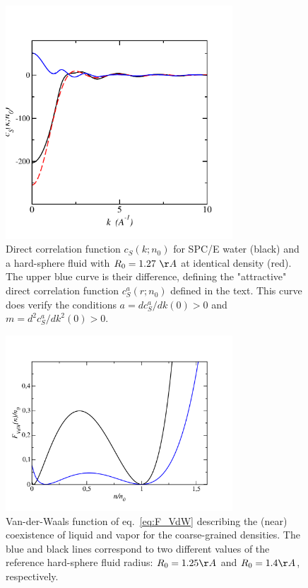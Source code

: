 \documentclass[aip,jcp,preprint]{revtex4-1}
\begin{document}
\begin{figure}
    \includegraphics[width=8.5cm]{cS_of_k_spc_PY_127.pdf}
    \caption{Direct correlation function $c_S(k;n_0)$ for SPC/E water (black) and a hard-sphere fluid with $R_0= 1.27~\AA$ at identical density (red). The upper blue curve is their difference, defining the "attractive" direct correlation function $c_S^a(r;n_0)$ defined   in the text. This curve does verify the conditions $a=dc_S^a/dk(0)  >0$ and $m = d^2c_S^a/dk^2(0) > 0$.
        \label{fig:ck_spc}
        }
\end{figure}

\begin{figure}
    \includegraphics[width=8.5cm]{F_VdW_R=125_R=14.pdf}
    \caption{Van-der-Waals function of eq.~\ref{eq:F_VdW} describing  the (near) coexistence of liquid and vapor for the coarse-grained densities. The blue and black lines correspond to two different values of the reference hard-sphere fluid radius:  $R_0 = 1.25 \AA$ and $R_0 = 1.4 \AA$, respectively.
        \label{fig:fn}
        }
\end{figure}
\end{document}
